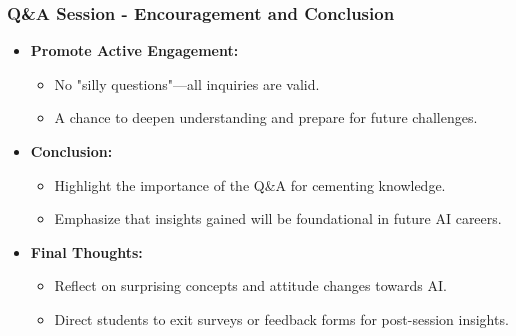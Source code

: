 \documentclass[aspectratio=169]{beamer}
\begin{document}
\begin{frame}[fragile]
    \frametitle{Q\&A Session - Encouragement and Conclusion}
    \begin{itemize}
        \item \textbf{Promote Active Engagement:}
        \begin{itemize}
            \item No "silly questions"—all inquiries are valid.
            \item A chance to deepen understanding and prepare for future challenges.
        \end{itemize}
        
        \item \textbf{Conclusion:}
        \begin{itemize}
            \item Highlight the importance of the Q\&A for cementing knowledge.
            \item Emphasize that insights gained will be foundational in future AI careers.
        \end{itemize}
        
        \item \textbf{Final Thoughts:}
        \begin{itemize}
            \item Reflect on surprising concepts and attitude changes towards AI.
            \item Direct students to exit surveys or feedback forms for post-session insights.
        \end{itemize}
    \end{itemize}
\end{frame}
\end{document}
